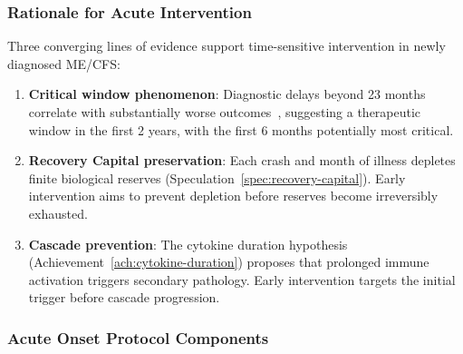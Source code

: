 \subsubsection{Rationale for Acute Intervention}

Three converging lines of evidence support time-sensitive intervention in newly diagnosed ME/CFS:

\begin{enumerate}
    \item \textbf{Critical window phenomenon}: Diagnostic delays beyond 23 months correlate with substantially worse outcomes~\cite{CastroMarrero2022prognosis}, suggesting a therapeutic window in the first 2 years, with the first 6 months potentially most critical.

    \item \textbf{Recovery Capital preservation}: Each crash and month of illness depletes finite biological reserves (Speculation~\ref{spec:recovery-capital}). Early intervention aims to prevent depletion before reserves become irreversibly exhausted.

    \item \textbf{Cascade prevention}: The cytokine duration hypothesis (Achievement~\ref{ach:cytokine-duration}) proposes that prolonged immune activation triggers secondary pathology. Early intervention targets the initial trigger before cascade progression.
\end{enumerate}

\subsubsection{Acute Onset Protocol Components}

